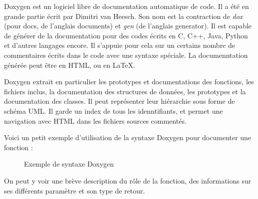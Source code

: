 \par
Doxygen est un logiciel libre de documentation automatique de code. Il a \'et\'e en grande partie \'ecrit par Dimitri van Heesch. Son nom est la contraction de \textit{dox} (pour docs, de l'anglais documents) et \textit{gen} (de l'anglais generator). Il est capable de g\'en\'erer de la documentation pour des codes \'ecrits en C, C++, Java, Python et d'autres langages encore. Il s'appuie pour cela sur un certains nombre de commentaires \'ecrits dans le code avec une syntaxe sp\'eciale. La documenntation g\'en\'er\'ee peut \^etre en HTML, ou en \LaTeX.
\par
Doxygen extrait en particulier les prototypes et documentations des fonctions, les fichiers inclus, la documentation des structures de donn\'ees, les prototypes et la documentation des classes. Il peut repr\'esenter leur hi\'erarchie sous forme de sch\'ema UML. Il garde un index de tous les idenntifiants, et permet une navigation avec HTML dans les fichiers sources comment\'es.
\par
Voici un petit exemple d'utilisation de la syntaxe Doxygen pour documenter une fonction :
\begin{figure}[ht]
\centering
{}
\caption{\label{exemple_doxygen} Exemple de syntaxe Doxygen}
\end{figure}

On peut y voir une br\`eve description du r\^ole de la fonction, des informations sur ses diff\'erents param\`etre et son type de retour.